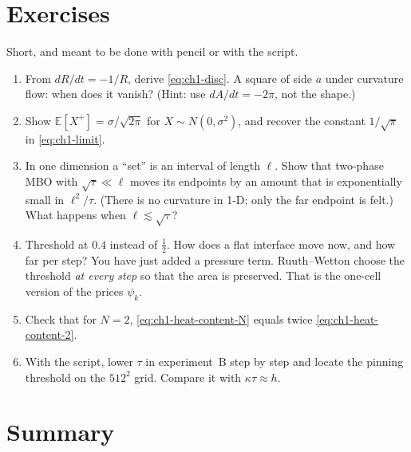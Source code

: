\section{Exercises}
\label{sec:ch1-exercises}

Short, and meant to be done with pencil or with the script.
\begin{enumerate}
  \item From $dR/dt = -1/R$, derive \eqref{eq:ch1-disc}. A square of side $a$ under
        curvature flow: when does it vanish? (Hint: use $dA/dt = -2\pi$, not the
        shape.)
  \item Show $\mathbb E[X^+] = \sigma/\sqrt{2\pi}$ for $X \sim N(0, \sigma^2)$, and
        recover the constant $1/\sqrt\pi$ in \eqref{eq:ch1-limit}.
  \item In one dimension a ``set'' is an interval of length $\ell$. Show that
        two-phase MBO with $\sqrt\tau \ll \ell$ moves its endpoints by an amount
        that is exponentially small in $\ell^2/\tau$. (There is no curvature in
        1-D; only the far endpoint is felt.) What happens when $\ell \lesssim \sqrt\tau$?
  \item Threshold at $0.4$ instead of $\tfrac12$. How does a flat interface move
        now, and how far per step? You have just added a pressure term.
        Ruuth--Wetton \cite{ruuth2003volume} choose the threshold \emph{at every
        step} so that the area is preserved. That is the one-cell version of the
        prices $\psi_k$.
  \item Check that for $N = 2$, \eqref{eq:ch1-heat-content-N} equals twice
        \eqref{eq:ch1-heat-content-2}.
  \item With the script, lower $\tau$ in experiment~B step by step and locate the
        pinning threshold on the $512^2$ grid. Compare it with $\kappa\tau \approx h$.
\end{enumerate}

\section{Summary}

